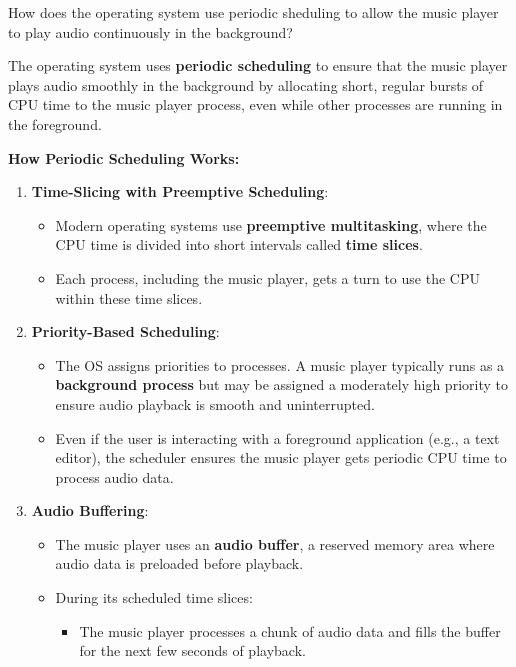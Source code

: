 \documentclass[a4paper]{book}
\begin{document}
\begin{greenbox}
How does the operating system use periodic sheduling to allow the music player to play audio continuously in the background?
\end{greenbox}

The operating system uses \textbf{periodic scheduling} to ensure that the music player plays audio smoothly in the background by allocating short, regular bursts of CPU time to the music player process, even while other processes are running in the foreground.

\textbf{How Periodic Scheduling Works:}

\begin{enumerate}
\item
\textbf{Time-Slicing with Preemptive Scheduling}:
\begin{itemize}
\item
Modern operating systems use \textbf{preemptive multitasking}, where the CPU time is divided into short intervals called \textbf{time slices}.

\item
Each process, including the music player, gets a turn to use the CPU within these time slices.   

\end{itemize}

\item
\textbf{Priority-Based Scheduling}:
\begin{itemize}
\item
The OS assigns priorities to processes. A music player typically runs as a \textbf{background process} but may be assigned a moderately high priority to ensure audio playback is smooth and uninterrupted.

\item
Even if the user is interacting with a foreground application (e.g., a text editor), the scheduler ensures the music player gets periodic CPU time to process audio data.

\end{itemize}

\item
\textbf{Audio Buffering}:
\begin{itemize}
\item
The music player uses an \textbf{audio buffer}, a reserved memory area where audio data is preloaded before playback.

\item
During its scheduled time slices:
\begin{itemize}
\item
The music player processes a chunk of audio data and fills the buffer for the next few seconds of playback.


\end{itemize}
\end{itemize}
\end{enumerate}
\end{document}
